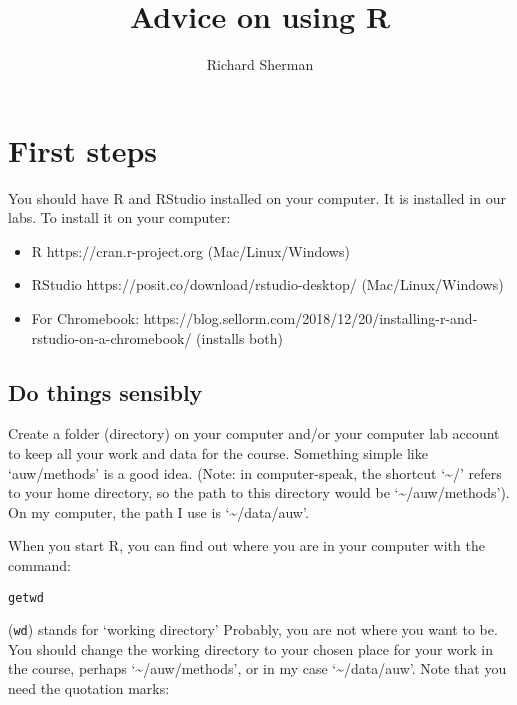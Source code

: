 \documentclass[
  letterpaper,
  DIV=11,
  numbers=noendperiod]{scrartcl}
\title{Advice on using R}
\author{Richard Sherman}
\date{}
\providecommand{\tightlist}{%
  \setlength{\itemsep}{0pt}\setlength{\parskip}{0pt}}\usepackage{longtable,booktabs,array}
\begin{document}
\maketitle
\ifdefined\Shaded\renewenvironment{Shaded}{\begin{tcolorbox}[sharp corners, boxrule=0pt, interior hidden, borderline west={3pt}{0pt}{shadecolor}, enhanced, frame hidden, breakable]}{\end{tcolorbox}}\fi

\hypertarget{first-steps}{%
\section{First steps}\label{first-steps}}

You should have \textsf{R} and \textsf{RStudio} installed on your
computer. It is installed in our labs. To install it on your computer:

\begin{itemize}
\tightlist
\item
  \textsf{R} https://cran.r-project.org (Mac/Linux/Windows)
\item
  \textsf{RStudio} https://posit.co/download/rstudio-desktop/
  (Mac/Linux/Windows)
\item
  For Chromebook:
  https://blog.sellorm.com/2018/12/20/installing-r-and-rstudio-on-a-chromebook/
  (installs both)
\end{itemize}

\hypertarget{do-things-sensibly}{%
\subsection{Do things sensibly}\label{do-things-sensibly}}

Create a folder (directory) on your computer and/or your computer lab
account to keep all your work and data for the course. Something simple
like `auw/methods' is a good idea. (Note: in computer-speak, the
shortcut `\textasciitilde/' refers to your home directory, so the path
to this directory would be `\textasciitilde/auw/methods'). On my
computer, the path I use is `\textasciitilde/data/auw'.

When you start \textsf{R}, you can find out where you are in your
computer with the command:

\texttt{getwd}

(\texttt{wd}) stands for `working directory' Probably, you are not where
you want to be. You should change the working directory to your chosen
place for your work in the course, perhaps
`\textasciitilde/auw/methods', or in my case `\textasciitilde/data/auw'.
Note that you need the quotation marks:
\end{document}
